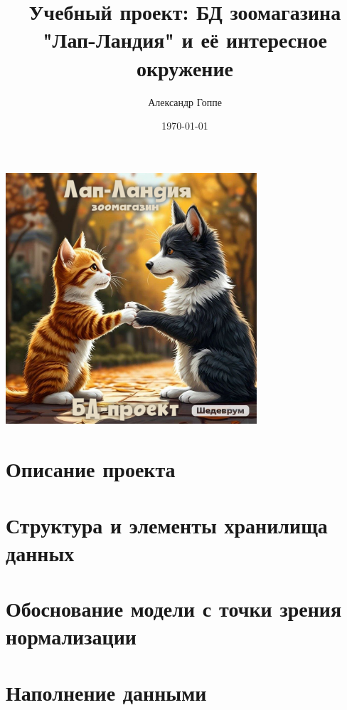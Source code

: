\documentclass[a4paper,12pt]{article}
\title{Учебный проект: БД зоомагазина "Лап-Ландия" и её интересное окружение}
\author{Александр Гоппе}
\date{}
\begin{document}
    \maketitle

    \begin{center}
        \includegraphics[width=0.7\textwidth]{title} %
    \end{center}

    \vfill
    \begin{center}
        \date{\today}
    \end{center}
    \newpage

    \tableofcontents
    \newpage

    \section{Описание проекта}\label{sec:projectdesc}
    

    \section{Структура и элементы хранилища данных}\label{sec:dbstructure}
    

    \section{Обоснование модели с точки зрения нормализации}\label{sec:normalization}
    

    \section{Наполнение данными}\label{sec:datafilling}
    
\end{document}
